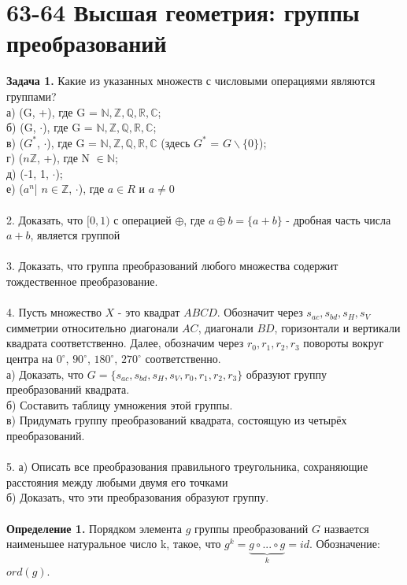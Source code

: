 \documentclass[12pt]{article}
\begin{document}
\section*{63-64 Высшая геометрия: группы преобразований}
\textbf{Задача 1.} Какие из указанных множеств с числовыми операциями являются группами?\\
а) (G, +), где G = $\mathbb{N,Z,Q,R,C}$;\\
б) (G, $\cdot$), где G = $\mathbb{N,Z,Q,R,C}$;\\
в) ($G^*$, $\cdot$), где G = $\mathbb{N,Z,Q,R,C}$ (здесь $G^*$ = $G\backslash\{0\}$);\\
г) ($n\mathbb Z$, +), где N $\in \mathbb{N}$;\\
д) ({-1, 1}, $\cdot$);\\
е) ({$a^n$| $n \in \mathbb{Z}$}, $\cdot$), где $a \in R$ и $a \neq 0$\\
\\
2. Доказать, что $[0,1)$ с операцией $\oplus$, где $a \oplus b = \{a+b\}$ - дробная часть числа $a+b$, является группой\\
\\
3. Доказать, что группа преобразований любого множества содержит тождественное преобразование.\\
\\
4. Пусть множество $X$ - это квадрат $ABCD$. Обозначит через $s_{ac},s_{bd},s_{H},s_{V}$ симметрии относительно диагонали $AC$, диагонали $BD$, горизонтали и вертикали квадрата соответственно. Далее, обозначим через $r_0, r_1, r_2, r_3$ повороты вокруг центра на $0^\circ$, $90^\circ$, $180^\circ$, $270^\circ$ соответственно.\\
а) Доказать, что $G = \{s_{ac}, s_{bd}, s_H, s_V, r_0, r_1, r_2, r_3\}$ образуют группу преобразований квадрата.\\
б) Составить таблицу умножения этой группы.\\
в) Придумать группу преобразований квадрата, состоящую из четырёх преобразований.\\
\\
5. а) Описать все преобразования правильного треугольника, сохраняющие расстояния между любыми двумя его точками\\
б) Доказать, что эти преобразования образуют группу.\\
\\
\textbf{Определение 1. }Порядком элемента $g$ группы преобразований $G$ назвается наименьшее натуральное число k, такое, что $g^k = \underbrace{g \circ ... \circ g}_{k} = id$. Обозначение: $ord(g)$.\\
\end{document}
